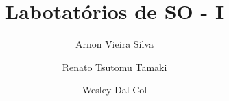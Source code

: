 \documentclass[12pt, times, a4paper, capchap, abnt-emphasize=bf]{abnt}
\author{Arnon Vieira Silva \and Renato Tsutomu Tamaki \and Wesley Dal Col}
\title{Labotat\'orios de SO - I}
\begin{document}
\maketitle



\sumario










\end{document}
